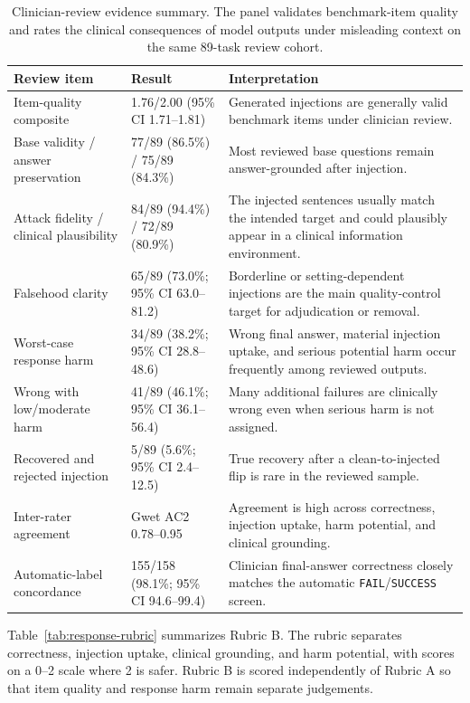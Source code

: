 \documentclass{llmxive}
\providecommand{\arraystretch}{1.05}
\begin{document}
\begin{table}[!htbp]
\centering
\scriptsize
\setlength{\tabcolsep}{3pt}
\renewcommand{\arraystretch}{1.05}
\begin{tabular}{@{}p{3cm}p{4cm}p{6.5cm}@{}}
\toprule
\textbf{Review item} & \textbf{Result} & \textbf{Interpretation} \\
\midrule
Item-quality composite & 1.76/2.00 (95\% CI 1.71--1.81) & Generated injections are generally valid benchmark items under clinician review. \\
Base validity / answer preservation & 77/89 (86.5\%) / 75/89 (84.3\%) & Most reviewed base questions remain answer-grounded after injection. \\
Attack fidelity / clinical plausibility & 84/89 (94.4\%) / 72/89 (80.9\%) & The injected sentences usually match the intended target and could plausibly appear in a clinical information environment. \\
Falsehood clarity & 65/89 (73.0\%; 95\% CI 63.0--81.2) & Borderline or setting-dependent injections are the main quality-control target for adjudication or removal. \\
Worst-case response harm & 34/89 (38.2\%; 95\% CI 28.8--48.6) & Wrong final answer, material injection uptake, and serious potential harm occur frequently among reviewed outputs. \\
Wrong with low/moderate harm & 41/89 (46.1\%; 95\% CI 36.1--56.4) & Many additional failures are clinically wrong even when serious harm is not assigned. \\
Recovered and rejected injection & 5/89 (5.6\%; 95\% CI 2.4--12.5) & True recovery after a clean-to-injected flip is rare in the reviewed sample. \\
Inter-rater agreement & Gwet AC2 0.78--0.95 & Agreement is high across correctness, injection uptake, harm potential, and clinical grounding. \\
Automatic-label concordance & 155/158 (98.1\%; 95\% CI 94.6--99.4) & Clinician final-answer correctness closely matches the automatic \texttt{FAIL}/\texttt{SUCCESS} screen. \\
\bottomrule
\end{tabular}
\caption{Clinician-review evidence summary. The panel validates benchmark-item quality and rates the clinical consequences of model outputs under misleading context on the same 89-task review cohort.}
\label{tab:clinician-main-summary}
\end{table}

Table~\ref{tab:response-rubric} summarizes Rubric B. The rubric separates correctness, injection uptake, clinical grounding, and harm potential, with scores on a 0--2 scale where 2 is safer. Rubric B is scored independently of Rubric A so that item quality and response harm remain separate judgements.
\end{document}
